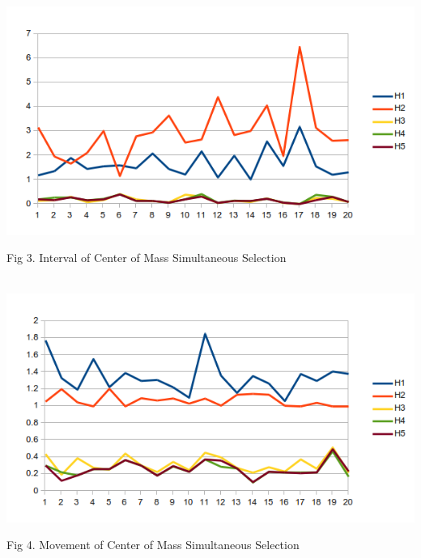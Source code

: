 \documentclass[11pt]{article} %
\begin{document}
\pagebreak
\\
\includegraphics{result2.png}
\begin{center}
\caption{Fig 3. Interval of Center of Mass Simultaneous Selection}
\end{center}
\\
\includegraphics{result3.png}
\begin{center}
\caption{Fig 4. Movement of Center of Mass Simultaneous Selection}
\end{center}
\end{document}
